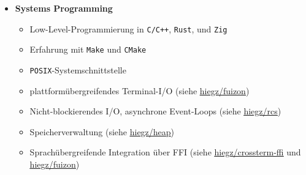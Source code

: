 \documentclass[]{article}
\begin{document}
\begin{minipage}[t]{0.49\linewidth}
    \begin{itemize}[leftmargin=0.15in, rightmargin=0.15in, label={}]
        \item {\large\bfseries Systems Programming}

            \begin{itemize}
                \item Low-Level-Programmierung in \verb|C/C++|, \verb|Rust|, und \verb|Zig|
                \item Erfahrung mit \verb|Make| und \verb|CMake|
                \item \verb|POSIX|-Systemschnittstelle
                \item plattformübergreifendes Terminal-I/O (siehe \href{https://github.com/hiegz/fuizon}{\ttfamily \underline{hiegz/fuizon}})
                \item Nicht-blockierendes I/O, asynchrone Event-Loops (siehe \href{https://github.com/hiegz/rcs}{\ttfamily \underline{hiegz/rcs}})
                \item Speicherverwaltung (siehe \href{https://github.com/hiegz/heap}{\ttfamily \underline{hiegz/heap}})
                \item Sprachübergreifende Integration über FFI (siehe
                    \href{https://github.com/hiegz/crossterm-ffi}{\ttfamily \underline{hiegz/crossterm-ffi}} und
                    \href{https://github.com/hiegz/fuizon}{\ttfamily \underline{hiegz/fuizon}})
            \end{itemize}
    \end{itemize}
\end{minipage}
\hspace{10pt}
\end{document}
